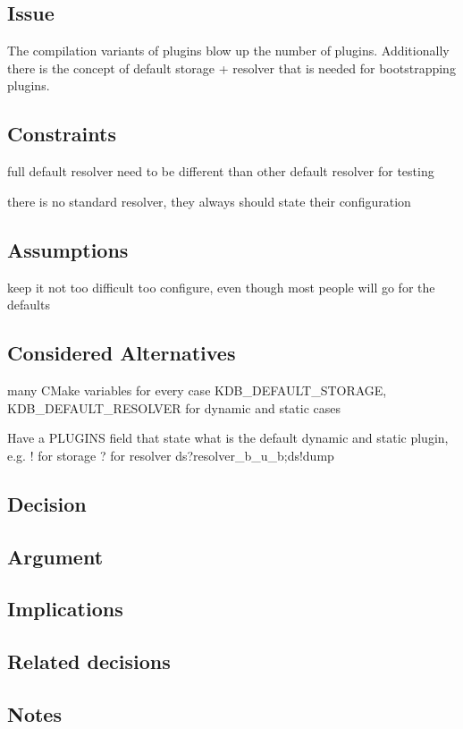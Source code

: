 \subsection*{Issue}

The compilation variants of plugins blow up the number of plugins. Additionally there is the concept of default storage + resolver that is needed for bootstrapping plugins.

\subsection*{Constraints}


\begin{DoxyItemize}
\item full default resolver need to be different than other default resolver for testing
\item there is no standard resolver, they always should state their configuration
\end{DoxyItemize}

\subsection*{Assumptions}


\begin{DoxyItemize}
\item keep it not too difficult too configure, even though most people will go for the defaults
\end{DoxyItemize}

\subsection*{Considered Alternatives}


\begin{DoxyItemize}
\item many C\+Make variables for every case K\+D\+B\+\_\+\+D\+E\+F\+A\+U\+L\+T\+\_\+\+S\+T\+O\+R\+A\+G\+E, K\+D\+B\+\_\+\+D\+E\+F\+A\+U\+L\+T\+\_\+\+R\+E\+S\+O\+L\+V\+E\+R for dynamic and static cases
\item Have a P\+L\+U\+G\+I\+N\+S field that state what is the default dynamic and static plugin, e.\+g. ! for storage ? for resolver ds?resolver\+\_\+b\+\_\+u\+\_\+b;ds!dump
\end{DoxyItemize}

\subsection*{Decision}

\subsection*{Argument}

\subsection*{Implications}

\subsection*{Related decisions}

\subsection*{Notes}